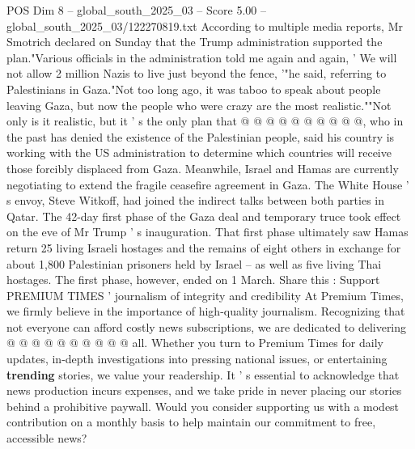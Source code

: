 \begin{textsample}{POS Dim 8 – global\_south\_2025\_03 – Score 5.00 – global\_south\_2025\_03/122270819.txt}
According to multiple media reports, Mr Smotrich declared on Sunday that the Trump administration supported the plan."Various officials in the administration told me again and again, ' We will not allow 2 million Nazis to live just beyond the fence, '"he said, referring to Palestinians in Gaza."Not too long ago, it was taboo to speak about people leaving Gaza, but now the people who were crazy are the most realistic.""Not only is it realistic, but it ' s the only plan that @ @ @ @ @ @ @ @ @ @, who in the past has denied the existence of the Palestinian people, said his country is working with the US administration to determine which countries will receive those forcibly displaced from Gaza.
Meanwhile, Israel and Hamas are currently negotiating to extend the fragile ceasefire agreement in Gaza.
The White House ' s envoy, Steve Witkoff, had joined the indirect talks between both parties in Qatar.
The 42-day first phase of the Gaza deal and temporary truce took effect on the eve of Mr Trump ' s inauguration.
That first phase ultimately saw Hamas return 25 living Israeli hostages and the remains of eight others in exchange for about 1,800 Palestinian prisoners held by Israel -- as well as five living Thai hostages.
The first phase, however, ended on 1 March.
Share this : Support PREMIUM TIMES ' journalism of integrity and credibility At Premium Times, we firmly believe in the importance of high-quality journalism.
Recognizing that not everyone can afford costly news subscriptions, we are dedicated to delivering @ @ @ @ @ @ @ @ @ @ all.
Whether you turn to Premium Times for daily updates, in-depth investigations into pressing national issues, or entertaining \textbf{trending} stories, we value your readership.
It ' s essential to acknowledge that news production incurs expenses, and we take pride in never placing our stories behind a prohibitive paywall.
Would you consider supporting us with a modest contribution on a monthly basis to help maintain our commitment to free, accessible news?

\end{textsample}

